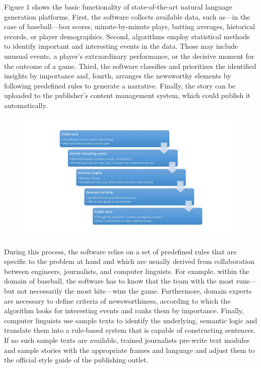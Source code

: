\documentclass[notoc, symmetric, nobib, nols]{towcenter-guideto-book}
\begin{document}
Figure 1 shows the basic functionality of state-of-the-art natural language generation platforms.\autocites{reiter2000,doerr15} First, the software collects available data, such as---in the case of baseball---box scores, minute-by-minute plays, batting averages, historical records, or player demographics. Second, algorithms employ statistical methods to identify important and interesting events in the data. Those may include unusual events, a player's extraordinary performance, or the decisive moment for the outcome of a game. Third, the software classifies and prioritizes the identified insights by importance and, fourth, arranges the newsworthy elements by following predefined rules to generate a narrative. Finally, the story can be uploaded to the publisher's content management system, which could publish it automatically.\\ 
\begin{figure}
\begin{centering}
\includegraphics[width=\textwidth]{graphics/aj_image1.jpg}
\caption{}
\end{centering}
\end{figure}
During this process, the software relies on a set of predefined rules that are specific to the problem at hand and which are usually derived from collaboration between engineers, journalists, and computer linguists. For example, within the domain of baseball, the software has to know that the team with the most runs---but not necessarily the most hits---wins the game. Furthermore, domain experts are necessary to define criteria of newsworthiness, according to which the algorithm looks for interesting events and ranks them by importance. Finally, computer linguists use sample texts to identify the underlying, semantic logic and translate them into a rule-based system that is capable of constructing sentences. If no such sample texts are available, trained journalists pre-write text modules and sample stories with the appropriate frames and language and adjust them to the official style guide of the publishing outlet.
\end{document}

